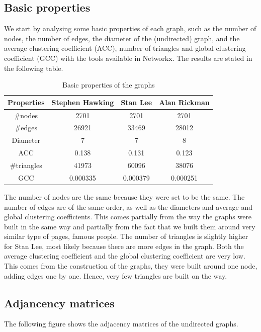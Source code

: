 \documentclass[conference]{IEEEtran}
\begin{document}
\subsection{Basic properties}
We start by analysing some basic properties of each graph, such as the number of nodes, the number of edges, the diameter of the (undirected) graph, and the average clustering coefficient (ACC), number of triangles and global clustering coefficient (GCC) with the tools available in Networkx. The results are stated in the  following table. 


\begin{table}[htbp]
\caption{Basic properties of the graphs}
\begin{center}
\begin{tabular}{|c|c|c|c|}
\hline
 Properties & \textbf{Stephen Hawking}& \textbf{Stan Lee}& \textbf{Alan Rickman} \\
\hline
$\#$nodes& 2701 &  2701 & 2701 \\
\hline
$\#$edges & 26921 & 33469 & 28012  \\
\hline
Diameter & 7 & 7 &  8\\
\hline
ACC & 0.138 & 0.131 &  0.123\\
\hline
$\#$triangles  & 41973 & 60096 & 38076  \\
\hline
GCC & 0.000335 & 0.000379 & 0.000251 \\
\hline
\end{tabular}
\end{center}
\end{table}

The number of nodes are the same because they were set to be the same. The number of edges are of the same order, as well as the diameters and average and global clustering coefficients. This comes partially from the way the graphs were built in the same way and partially from the fact that we built them around very similar type of pages, famous people. The number of triangles is slightly higher for Stan Lee, most likely because there are more edges in the graph. Both the average clustering coefficient and the global clustering coefficient are very low. This comes from the construction of the graphs, they were built around one node, adding edges one by one. Hence, very few triangles are built on the way. 

\subsection{Adjancency matrices}
 The following figure shows the adjacency matrices of the undirected graphs.
 
\end{document}
